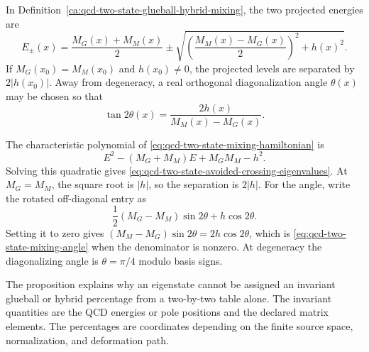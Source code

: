 \begin{remark}
\label{rem:qcd-two-state-avoided-crossing}
In Definition~\ref{ca:qcd-two-state-glueball-hybrid-mixing}, the two
projected energies are
\begin{equation}
  E_\pm(x)
  =
  \frac{M_G(x)+M_M(x)}2
  \pm
  \sqrt{
    \left(\frac{M_M(x)-M_G(x)}2\right)^2+h(x)^2
  }.
  \label{eq:qcd-two-state-avoided-crossing-eigenvalues}
\end{equation}
If \(M_G(x_0)=M_M(x_0)\) and \(h(x_0)\ne0\), the projected levels are
separated by \(2|h(x_0)|\).  Away from degeneracy, a real orthogonal
diagonalization angle \(\theta(x)\) may be chosen so that
\begin{equation}
  \tan 2\theta(x)=\frac{2h(x)}{M_M(x)-M_G(x)}.
  \label{eq:qcd-two-state-mixing-angle}
\end{equation}
\par
The characteristic polynomial of
\eqref{eq:qcd-two-state-mixing-hamiltonian} is
\[
  E^2-(M_G+M_M)E+M_GM_M-h^2 .
\]
Solving this quadratic gives
\eqref{eq:qcd-two-state-avoided-crossing-eigenvalues}.  At \(M_G=M_M\), the
square root is \(|h|\), so the separation is \(2|h|\).  For the angle, write
the rotated off-diagonal entry as
\[
  \frac12(M_G-M_M)\sin2\theta+h\cos2\theta .
\]
Setting it to zero gives
\((M_M-M_G)\sin2\theta=2h\cos2\theta\), which is
\eqref{eq:qcd-two-state-mixing-angle} when the denominator is nonzero.  At
degeneracy the diagonalizing angle is \(\theta=\pi/4\) modulo basis signs.
\end{remark}

The proposition explains why an eigenstate cannot be assigned an invariant
glueball or hybrid percentage from a two-by-two table alone.  The invariant
quantities are the QCD energies or pole positions and the declared matrix
elements.  The percentages are coordinates depending on the finite source
space, normalization, and deformation path.

